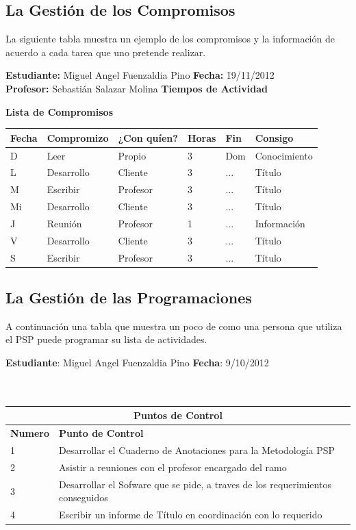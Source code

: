 \documentclass[a4paper,12pt,openany,oneside]{book}
\begin{document}
\subsection{La Gestión de los Compromisos}
La siguiente tabla muestra un ejemplo de los compromisos y la información de acuerdo a cada tarea que uno pretende realizar.

\begin{tabbing}
\textbf{Estudiante:} \= Miguel Angel Fuenzaldia Pino \= \textbf{Fecha:} \= 19/11/2012\\
\textbf{Profesor:} \> Sebastián Salazar Molina \> \textbf{Tiempos de Actividad} \>  \\
\end{tabbing}
\textbf{Lista de Compromisos}\\
\begin{tabular}{| l | l | l | l | l | l |}
\hline
\textbf{Fecha} & \textbf{Compromizo} & \textbf{¿Con quíen?} & \textbf{Horas} & \textbf{Fin} & \textbf{Consigo} \\
\hline
D  & Leer       & Propio   & 3 & Dom & Conocimiento \\
\hline
L  & Desarrollo & Cliente  & 3 & ... & Título \\
\hline
M  & Escribir   & Profesor & 3 & ... & Título \\
\hline
Mi & Desarrollo & Cliente  & 3 & ... & Título \\
\hline
J  & Reunión    & Profesor & 1 & ... & Información \\
\hline
V  & Desarrollo & Cliente  & 3 & ... & Título \\
\hline
S  & Escribir   & Profesor & 3 & ... & Título \\
\hline
\end{tabular}
\subsection{La Gestión de las Programaciones}
A continuación una tabla que muestra un poco de como una persona que utiliza el PSP puede programar su lista de actividades.

\textbf{Estudiante}: Miguel Angel Fuenzaldia Pino     \textbf{Fecha}: 9/10/2012\\\\\
\begin{tabular}{| l | l |}
\hline
\multicolumn{2}{|c|}{\textbf{Puntos de Control}}\\
\hline
\textbf{Numero} & \textbf{Punto de Control}\\
\hline
1 & Desarrollar el Cuaderno de Anotaciones para la Metodología PSP \\
\hline
2 & Asistir a reuniones con el profesor encargado del ramo \\
\hline
3 & Desarrollar el Sofware que se pide, a traves de los requerimientos conseguidos \\
\hline
4 & Escribir un informe de Título en coordinación con lo requerido\\
\hline
\end{tabular}
\end{document}
